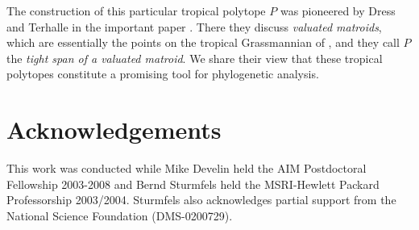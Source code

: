 \documentclass[11pt]{amsart}
\begin{document}
The construction of this particular tropical polytope $P$
was pioneered by Dress and Terhalle in the important paper \cite{DT}.
There they discuss \emph{valuated matroids}, which are
essentially the points on the tropical Grassmannian
of \cite{SS}, and they call  $P$ the \emph{tight span of 
a valuated matroid}. We share their view that these
tropical polytopes constitute a promising tool for
 phylogenetic analysis.


\vskip 2cm


\section*{Acknowledgements}
This work was conducted while Mike Develin held
the AIM Postdoctoral Fellowship 2003-2008 and 
Bernd Sturmfels held the MSRI-Hewlett Packard 
Professorship 2003/2004. Sturmfels also acknowledges
partial support from the National Science Foundation
(DMS-0200729).

\bigskip
\end{document}
